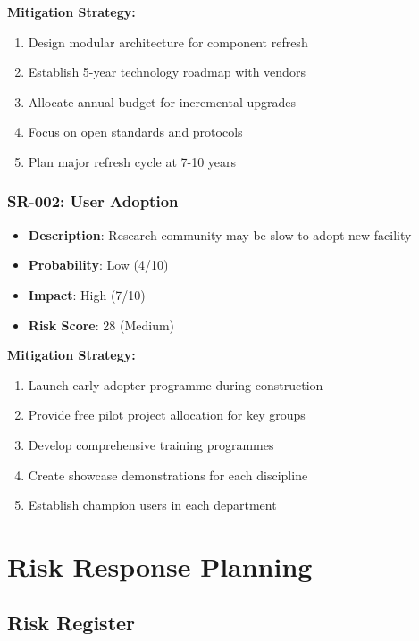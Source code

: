 \textbf{Mitigation Strategy:}
\begin{enumerate}
\item Design modular architecture for component refresh
\item Establish 5-year technology roadmap with vendors
\item Allocate annual budget for incremental upgrades
\item Focus on open standards and protocols
\item Plan major refresh cycle at 7-10 years
\end{enumerate}

\subsubsection{SR-002: User Adoption}
\begin{itemize}
\item \textbf{Description}: Research community may be slow to adopt new facility
\item \textbf{Probability}: Low (4/10)
\item \textbf{Impact}: High (7/10)
\item \textbf{Risk Score}: 28 (Medium)
\end{itemize}

\textbf{Mitigation Strategy:}
\begin{enumerate}
\item Launch early adopter programme during construction
\item Provide free pilot project allocation for key groups
\item Develop comprehensive training programmes
\item Create showcase demonstrations for each discipline
\item Establish champion users in each department
\end{enumerate}

\section{Risk Response Planning}

\subsection{Risk Register}

